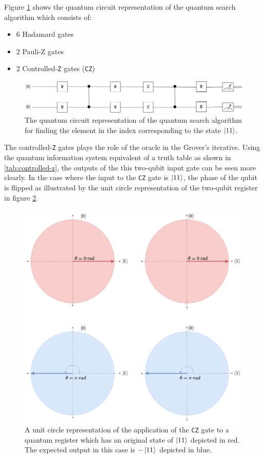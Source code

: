 Figure \ref{fig:grovers-circuit} shows the quantum circuit representation of the quantum search algorithm which consists of:
\begin{itemize}
	\item 
	6 Hadamard gates
	\item 
	2 Pauli-Z gates
	\item 
	2 Controlled-\texttt{Z} gates (\texttt{CZ})
\end{itemize}
\begin{figure}[!ht]
	\centering
	\includegraphics[width=1.0\linewidth]{body/ch4/figs/grovers-circuit}
	\caption[Quantum Circuit for Finding the Index of an Entry in a Database.]{The quantum circuit representation of the quantum search algorithm for finding the element in the index corresponding to the state $\ket{11}$.}
	\label{fig:grovers-circuit}
\end{figure}
The controlled-\texttt{Z} gates plays the role of the oracle in the Grover's iterative. Using the quantum information system equivalent of a truth table as shown in \ref{tab:controlled-z}, the outputs of the this two-qubit input gate can be seen more clearly. In the case where the input to the \texttt{CZ} gate is $\ket{11}$, the phase of the qubit is flipped as illustrated by the unit circle representation of the two-qubit register in figure \ref{fig:grover-phase-flip}.
\begin{figure}[!ht]
	\centering
	\includegraphics[width=1.0\linewidth]{body/ch4/figs/grover-phase-flip}
	\caption[Graphical Representation of the Controlled-Z Gate Applied in the Quantum Oracle of Grover's Search Algorithm.]{A unit circle representation of the application of the \texttt{CZ} gate to a quantum register which has an original state of $\ket{11}$ depicted in red. The expected output in this case is  $-\ket{11}$ depicted in blue.}
	\label{fig:grover-phase-flip}
\end{figure}
